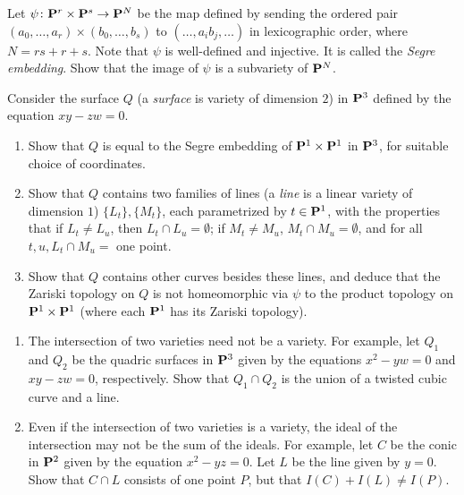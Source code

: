 \documentclass[10pt]{amsart}
\begin{document}
\begin{exercise}[2.14]
    Let $\psi\colon {\bf P}^r \times {\bf P}^s \to {\bf P}^N$ be the map defined by sending
    the ordered pair $(a_0, \ldots, a_r) \times (b_0, \ldots, b_s)$ to $(\ldots,
    a_ib_j, \ldots)$ in lexicographic order, where $N = rs + r +s$. Note that
    $\psi$ is well-defined and injective. It is called the \emph{Segre embedding}.
    Show that the image of $\psi$ is a subvariety of ${\bf P}^N$.
\end{exercise}

\begin{solution}
    
\end{solution}

\begin{exercise}[2.15]
    Consider the surface $Q$ (a \emph{surface} is variety of dimension $2$) in
    ${\bf P}^3$ defined by the equation $xy-zw = 0$.
    \begin{enumerate} 
      \item Show that $Q$ is equal to the Segre embedding of ${\bf P}^1 \times {\bf P}^1$ in
        ${\bf P}^3$, for suitable choice of coordinates.
      \item Show that $Q$ contains two families of lines (a \emph{line} is a
        linear variety of dimension $1$) $\{L_t\}, \{M_t\}$, each parametrized by
        $t \in {\bf P}^1$, with the properties that if $L_t \ne L_u$, then
        $L_t \cap L_u = \emptyset$; if $M_t \ne M_u$, $M_t \cap M_u = \emptyset$,
        and for all $t,u, L_t \cap M_u =$ one point. 
      \item Show that $Q$ contains other curves besides these lines, and deduce that
        the Zariski topology on $Q$ is not homeomorphic via $\psi$ to the product
        topology on ${\bf P}^1 \times {\bf P}^1$ (where each ${\bf P}^1$ has its Zariski
        topology). 
    \end{enumerate}
\end{exercise}

\begin{solution}
    
\end{solution}

\begin{exercise}[2.16]
    \begin{enumerate}
        \item The intersection of two varieties need not be a variety. For example,
        let $Q_1$ and $Q_2$ be the quadric surfaces in ${\bf P}^3$ given by the
        equations $x^2-yw = 0$ and $xy - zw =0$, respectively. Show that $Q_1 \cap
        Q_2$ is the union of a twisted cubic curve and a line.
        
        \item Even if the intersection of two varieties is a variety, the ideal of the
        intersection may not be the sum of the ideals. For example, let $C$ be the
        conic in ${\bf P}^2$ given by the equation $x^2-yz = 0$. Let $L$ be the line
        given by $y = 0$. Show that $C \cap L$ consists of one point $P$, but that
        $I(C) + I(L) \ne I(P)$. 
    \end{enumerate}
\end{exercise}
\end{document}
